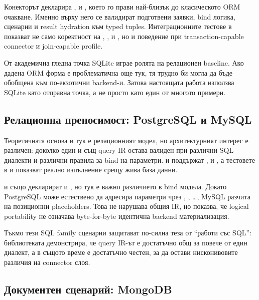 Конекторът декларира ,  и , което го прави най-близък до класическото ORM очакване. Именно върху него се валидират подготвени заявки, bind логика,  сценарии и result hydration към typed tuples. Интеграционните тестове в  показват не само коректност на , ,  и , но и поведение при transaction-capable connector и join-capable profile.

От академична гледна точка SQLite играе ролята на релационен baseline. Ако дадена ORM форма е проблематична още тук, тя трудно би могла да бъде обобщена към по-екзотични backend-и. Затова настоящата работа използва SQLite като отправна точка, а не просто като един от многото примери.

\subsection{Релационна преносимост: PostgreSQL и MySQL}

Теоретичната основа и тук е релационният модел, но архитектурният интерес е различен: доколко един и същ query IR остава валиден при различни SQL диалекти и различни правила за bind на параметри.  и  поддържат ,  и , а тестовете в  и  показват реално изпълнение срещу жива база данни.

 и  също декларират  и , но тук е важно различието в bind модела. Докато PostgreSQL може естествено да адресира параметри чрез , , \ldots{}, MySQL разчита на позиционни  placeholders. Това не нарушава общия IR, но показва, че logical portability не означава byte-for-byte идентична backend материализация.

Тъкмо тези SQL family сценарии защитават по-силна теза от ``работи със SQL'': библиотеката демонстрира, че query IR-ът е достатъчно общ за повече от един диалект, а в същото време е достатъчно честен, за да остави нисконивовите различия на connector слоя.

\subsection{Документен сценарий: MongoDB}

